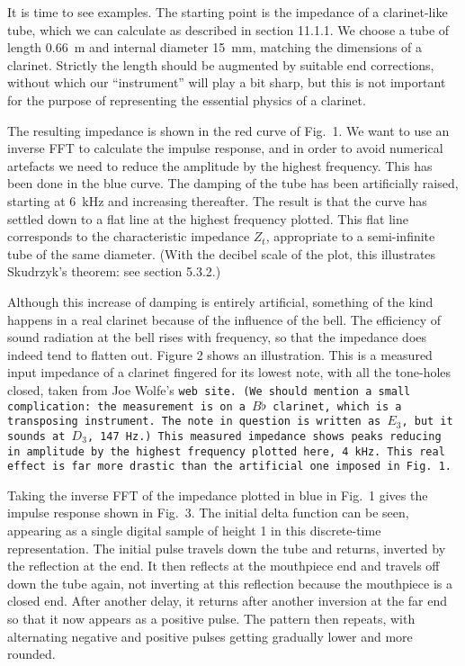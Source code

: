   It is time to see examples. The starting point is the impedance of a 
  clarinet-like tube, which we can calculate as described in section 11.1.1. We 
  choose a tube of length 0.66~m and internal diameter 15~mm, matching the 
  dimensions of a clarinet. Strictly the length should be augmented by suitable 
  end corrections, without which our ``instrument'' will play a bit sharp, but 
  this is not important for the purpose of representing the essential physics 
  of a clarinet. 

  The resulting impedance is shown in the red curve of Fig.\ 1. We want to use 
  an inverse FFT to calculate the impulse response, and in order to avoid 
  numerical artefacts we need to reduce the amplitude by the highest frequency. 
  This has been done in the blue curve. The damping of the tube has been 
  artificially raised, starting at 6~kHz and increasing thereafter. The result 
  is that the curve has settled down to a flat line at the highest frequency 
  plotted. This flat line corresponds to the characteristic impedance $Z_t$, 
  appropriate to a semi-infinite tube of the same diameter. (With the decibel 
  scale of the plot, this illustrates Skudrzyk's theorem: see section 5.3.2.) 


  Although this increase of damping is entirely artificial, something of the 
  kind happens in a real clarinet because of the influence of the bell. The 
  efficiency of sound radiation at the bell rises with frequency, so that the 
  impedance does indeed tend to flatten out. Figure 2 shows an illustration. 
  This is a measured input impedance of a clarinet fingered for its lowest 
  note, with all the tone-holes closed, taken from Joe Wolfe's \tt{}web 
  site\rm{}. (We should mention a small complication: the measurement is on a 
  $B\flat$ clarinet, which is a transposing instrument. The note in question is 
  written as $E_3$, but it sounds at $D_3$, 147~Hz.) This measured impedance 
  shows peaks reducing in amplitude by the highest frequency plotted here, 4 
  kHz. This real effect is far more drastic than the artificial one imposed in 
  Fig.\ 1. 

  Taking the inverse FFT of the impedance plotted in blue in Fig.\ 1 gives the 
  impulse response shown in Fig.\ 3. The initial delta function can be seen, 
  appearing as a single digital sample of height 1 in this discrete-time 
  representation. The initial pulse travels down the tube and returns, inverted 
  by the reflection at the end. It then reflects at the mouthpiece end and 
  travels off down the tube again, not inverting at this reflection because the 
  mouthpiece is a closed end. After another delay, it returns after another 
  inversion at the far end so that it now appears as a positive pulse. The 
  pattern then repeats, with alternating negative and positive pulses getting 
  gradually lower and more rounded. 

